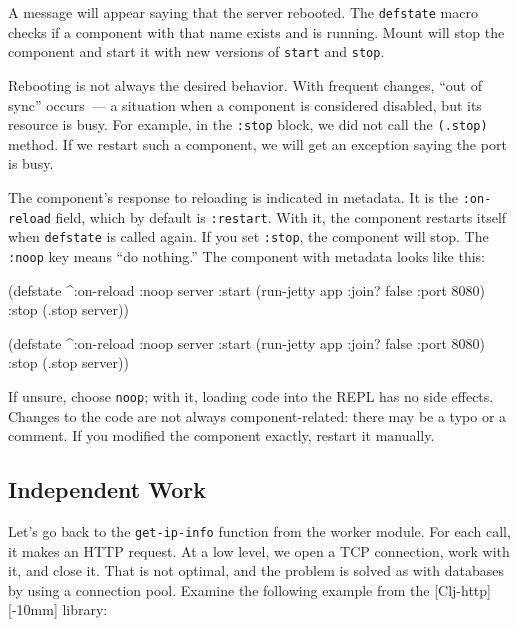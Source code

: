 A message will appear saying that the server rebooted. The \verb|defstate| macro checks if a component with that name exists and is running. Mount will stop the component and start it with new versions of \verb|start| and \verb|stop|.

Rebooting is not always the desired behavior. With frequent changes, ``out of sync'' occurs~--- a situation when a component is considered disabled, but its resource is busy. For example, in the \verb|:stop| block, we did not call the \verb|(.stop)| method. If we restart such a component, we will get an exception saying the port is busy.

The component's response to reloading is indicated in metadata. It is the \verb|:on-reload| field, which by default is \verb|:restart|. With it, the component restarts itself when \verb|defstate| is called again. If you set \verb|:stop|, the component will stop. The \verb|:noop| key means ``do nothing.'' The component with metadata looks like this:

\ifnarrow

\begin{english}
  \begin{clojure}
(defstate
  ^{:on-reload :noop}
  server
  :start (run-jetty app
           {:join? false :port 8080})
  :stop (.stop server))
  \end{clojure}
\end{english}

\else

\begin{english}
  \begin{clojure}
(defstate
  ^{:on-reload :noop}
  server
  :start (run-jetty app {:join? false :port 8080})
  :stop (.stop server))
  \end{clojure}
\end{english}

\fi

If unsure, choose \verb|noop|; with it, loading code into the REPL has no side effects. Changes to the code are not always component-related: there may be a typo or a comment. If you modified the component exactly, restart it manually.

\subsection{Independent Work}


Let's go back to the \verb|get-ip-info| function from the worker module. For each call, it makes an HTTP request. At a low level, we open a TCP connection, work with it, and close it. That is not optimal, and the problem is solved as with databases by using a connection pool. Examine the following example from the [Clj-http][-10mm] library:

